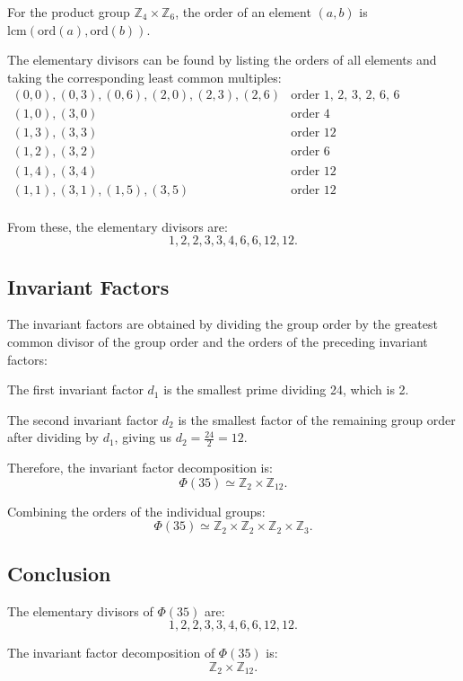 \documentclass[12pt]{amsart}
\theoremstyle{definition}
\numberwithin{equation}{section}
\newcommand{\Z}{\mathbb{Z}}
\begin{document}
\begin{exercise}{7}
    For the product group \(\Z_4 \times \Z_6\), the order of an element \((a, b)\) is \(\text{lcm}(\text{ord}(a), \text{ord}(b))\).

    The elementary divisors can be found by listing the orders of all elements and taking the corresponding least common multiples:
    \[
    \begin{array}{ll}
        (0,0), (0,3), (0,6), (2,0), (2,3), (2,6) & \text{order 1, 2, 3, 2, 6, 6 respectively} \\
        (1,0), (3,0) & \text{order 4}\\
        (1,3), (3,3) & \text{order 12} \\
        (1,2), (3,2) & \text{order 6} \\
        (1,4), (3,4) & \text{order 12} \\
        (1,1), (3,1), (1,5), (3,5) & \text{order 12} \\
    \end{array}
    \]

    From these, the elementary divisors are:
    \[
    1, 2, 2, 3, 3, 4, 6, 6, 12, 12.
    \]

    \subsection*{Invariant Factors}

    The invariant factors are obtained by dividing the group order by the greatest common divisor of the group order and the orders of the preceding invariant factors:

    The first invariant factor \(d_1\) is the smallest prime dividing 24, which is 2.

    The second invariant factor \(d_2\) is the smallest factor of the remaining group order after dividing by \(d_1\), giving us \(d_2 = \frac{24}{2} = 12\).

    Therefore, the invariant factor decomposition is:
    \[
    \Phi(35) \simeq \Z_2 \times \Z_{12}.
    \]

    Combining the orders of the individual groups:
    \[
    \Phi(35) \simeq \Z_2 \times \Z_2 \times \Z_2 \times \Z_3.
    \]

    \subsection*{Conclusion}

    The elementary divisors of \(\Phi(35)\) are:
    \[
    1, 2, 2, 3, 3, 4, 6, 6, 12, 12.
    \]

    The invariant factor decomposition of \(\Phi(35)\) is:
    \[
    \Z_2 \times \Z_{12}.
    \]
    
\end{exercise}
\end{document}
